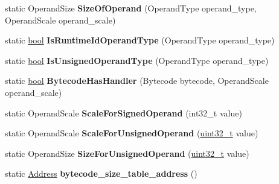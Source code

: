 \begin{DoxyCompactItemize}
\mbox{\label{classv8_1_1internal_1_1interpreter_1_1Bytecodes_a7dcf04a33b5acb8f1ee4b176286ea7a5}} 
static Operand\+Size {\bfseries Size\+Of\+Operand} (Operand\+Type operand\+\_\+type, Operand\+Scale operand\+\_\+scale)
\item 
\mbox{\label{classv8_1_1internal_1_1interpreter_1_1Bytecodes_ad26c48912c5c3cd9564a524995120c72}} 
static \mbox{\hyperlink{classbool}{bool}} {\bfseries Is\+Runtime\+Id\+Operand\+Type} (Operand\+Type operand\+\_\+type)
\item 
\mbox{\label{classv8_1_1internal_1_1interpreter_1_1Bytecodes_ad2a4f8ecd3f16eec011b54b97551c801}} 
static \mbox{\hyperlink{classbool}{bool}} {\bfseries Is\+Unsigned\+Operand\+Type} (Operand\+Type operand\+\_\+type)
\item 
\mbox{\label{classv8_1_1internal_1_1interpreter_1_1Bytecodes_aec091240b4ac4697d9086609eaeb6b1c}} 
static \mbox{\hyperlink{classbool}{bool}} {\bfseries Bytecode\+Has\+Handler} (Bytecode bytecode, Operand\+Scale operand\+\_\+scale)
\item 
\mbox{\label{classv8_1_1internal_1_1interpreter_1_1Bytecodes_ac3db135672566de2efc891ebe621d9fc}} 
static Operand\+Scale {\bfseries Scale\+For\+Signed\+Operand} (int32\+\_\+t value)
\item 
\mbox{\label{classv8_1_1internal_1_1interpreter_1_1Bytecodes_a1632f61e415c9358278cfa12c9bfd0cc}} 
static Operand\+Scale {\bfseries Scale\+For\+Unsigned\+Operand} (\mbox{\hyperlink{classuint32__t}{uint32\+\_\+t}} value)
\item 
\mbox{\label{classv8_1_1internal_1_1interpreter_1_1Bytecodes_ab0eb14aa42d3ed483825ed6b97970af2}} 
static Operand\+Size {\bfseries Size\+For\+Unsigned\+Operand} (\mbox{\hyperlink{classuint32__t}{uint32\+\_\+t}} value)
\item 
\mbox{\label{classv8_1_1internal_1_1interpreter_1_1Bytecodes_a66d2f9ffbfb241a7637b906b584b0fa9}} 
static \mbox{\hyperlink{classuintptr__t}{Address}} {\bfseries bytecode\+\_\+size\+\_\+table\+\_\+address} ()
\end{DoxyCompactItemize}
